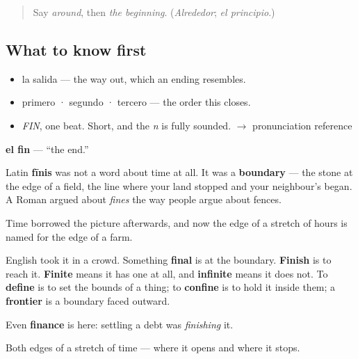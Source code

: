 \label{lesson:ES-C348-fin}



\begin{quote}
Say \emph{around}, then \emph{the beginning}. (\emph{Alrededor}; \emph{el principio}.)
\end{quote}

\subsection*{What to know first}
\begin{itemize}
\raggedright
  \item la salida — the way out, which an ending resembles.
  \item primero · segundo · tercero — the order this closes.
\end{itemize}

\begin{sounds}
\begin{itemize}
\raggedright
  \item \emph{FIN}, one beat. Short, and the \emph{n} is fully sounded. $\to$ pronunciation reference
\end{itemize}
\end{sounds}

\begin{cousinweb}
\textbf{el fin} — \textquotedblleft{}the end.\textquotedblright{}

Latin \textbf{fīnis} was not a word about time at all. It was a \textbf{boundary} — the stone at the edge of a field, the line where your land stopped and your neighbour's began. A Roman argued about \emph{fines} the way people argue about fences.

Time borrowed the picture afterwards, and now the edge of a stretch of hours is named for the edge of a farm.

English took it in a crowd. Something \textbf{final} is at the boundary. \textbf{Finish} is to reach it. \textbf{Finite} means it has one at all, and \textbf{infinite} means it does not. To \textbf{define} is to set the bounds of a thing; to \textbf{confine} is to hold it inside them; a \textbf{frontier} is a boundary faced outward.

Even \textbf{finance} is here: settling a debt was \emph{finishing} it.
\end{cousinweb}

\begin{grammarlens}[title={What you've built}]
Both edges of a stretch of time — where it opens and where it stops.
\end{grammarlens}

